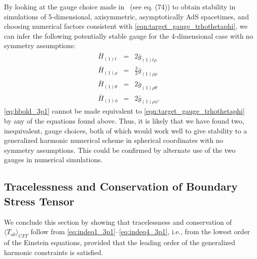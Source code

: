\documentclass[a4paper,11pt]{article}
\numberwithin{equation}{section}
\begin{document}
By looking at the gauge choice made in~\cite{Bantilan:2012vu} (see eq. (74)) to obtain stability in simulations of 5-dimensional, axisymmetric, asymptotically AdS spacetimes, and choosing numerical factors consistent with \eqref{eqn:target_gauge_trhothetaphi}, we can infer the following potentially stable gauge for the 4-dimensional case with no symmetry assumptions:%
\begin{eqnarray}
\label{eq:hbold_3p1}
\bar{H}_{(1)t}&=&2 \bar{g}_{(1)\text{$t$$\rho $}} \nonumber\\
\bar{H}_{(1)\rho}&=&\frac{3}{2} \bar{g}_{(1) \rho \rho }\nonumber\\
\bar{H}_{(1)\theta}&=&2 \bar{g}_{(1) \rho \theta }\nonumber\\
\bar{H}_{(1)\phi}&=&2 \bar{g}_{(1) \rho \phi }.
\end{eqnarray}
\eqref{eq:hbold_3p1} cannot be made equivalent to \eqref{eqn:target_gauge_trhothetaphi} by any of the equations found above. Thus, it is likely that we have found two, inequivalent, gauge choices, both of which would work well to give stability to a generalized harmonic numerical scheme in spherical coordinates with no symmetry assumptions. This could be confirmed by alternate use of the two gauges in numerical simulations.

\subsection{Tracelessness and Conservation of Boundary Stress Tensor}

We conclude this section by showing that tracelessness and conservation of $\langle T_{ab}\rangle_{CFT}$ follow from \eqref{eq:indeq1_3p1}--\eqref{eq:indeq4_3p1}, i.e., from the lowest order of the Einstein equations, provided that the leading order of the generalized harmonic constraints is satisfied. 
\end{document}
